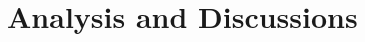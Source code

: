 \documentclass{article} \usepackage{iclr2021_conference,times}
\begin{document}
\begin{comment}
\begin{table*}[t]
	\small
	\centering
	\caption{Comparison of searched CNN in the standard space on three different datasets and report the \textbf{lowest error rate} of 3 found architectures retrained from scratch. : Training setup follows SDARTS \citep{chen2020stabilizing} where all models have 20 cells and 36 initial channels. : Training setup follows R-DARTS \citep{zela2020understanding}.}\smallskip
	\smallskip\begin{tabular}{c*{12}{|c}}
		\hline
		\multicolumn{2}{c|}{\textbf{Benchmark}} &  \textbf{RS-ws}  &  \textbf{DARTS}  &  \textbf{PC-DARTS}  &  \textbf{R-DARTS(DP)}  &  \textbf{R-DARTS(L2)}  &  \textbf{DARTS-ES}  &  \textbf{DARTS-ADA}  &  \textbf{SDARTS-RS}  &  \textbf{SDARTS-ADV}  &  \textbf{Ours}  &  \textbf{Ours}\\
		\hline
		\multirow{2}*{C10}  &  S2 &  3.66 &  4.85 &  3.02 &  3.48 &  3.31 &  3.26 &  3.35 &  2.75 &  2.65 &  \textbf{2.63}  &  \textbf{2.63} \\\cline{2-13}
		~     &  S3 &  2.95 &  3.34 &  2.51 &  2.93 &  2.51 &  2.74 &  2.59 &  2.53 &  \textbf{2.49} & 2.50  &  2.50 \\\hline
		\multirow{2}*{C100}  &  S2 &  21.21 &  26.05 &  18.23 &  22.30 &  22.24 &  23.25 &  23.52 &  17.56 &  17.24 &  \textbf{17.10}  &  \textbf{22.15}\\\cline{2-13}
		~     &  S3 &  23.75 &  28.90 &  18.05 &  22.36 &  23.99 &  23.73 &  23.37 &  17.73 &  17.12 &  \textbf{15.86} &  \textbf{21.13}\\\hline
		\multirow{2}*{SVHN}  &  S2 &  2.72 &  3.53 &  2.39 &  2.52 &  2.51 &  2.60 &  2.54 &  2.37 &  \textbf{2.07} & 2.12 &  2.57\\ \cline{2-13}
		~    &  S3 &  2.87 &  3.41 &  2.27 &  2.49 &  2.48 &  2.50 &  2.50 &  2.21 &  \textbf{2.05} &  2.21 &  2.69\\\hline\end{tabular}
	\label{tab:comparison-rdarts-s2-s3-best}
\end{table*}
\end{comment}

\section{Analysis and Discussions}
\end{document}
